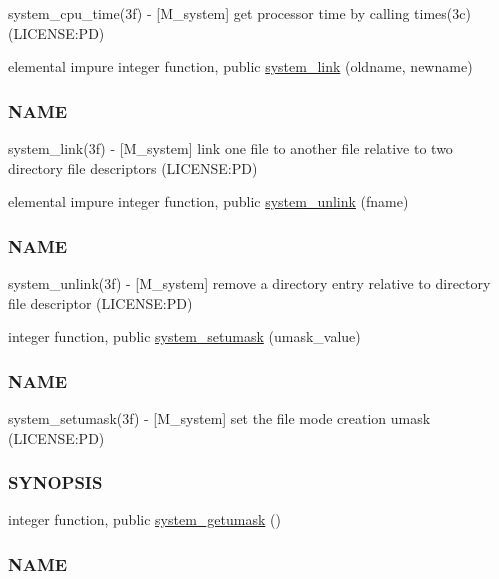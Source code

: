 \begin{DoxyCompactItemize}
\begin{DoxyCompactList}
system\+\_\+cpu\+\_\+time(3f) -\/ \mbox{[}M\+\_\+system\mbox{]} get processor time by calling times(3c) (L\+I\+C\+E\+N\+SE\+:PD) \end{DoxyCompactList}\item 
elemental impure integer function, public \mbox{\hyperlink{namespacem__system_a0e04b5499fc3367eda9758b6e396a103}{system\+\_\+link}} (oldname, newname)
\begin{DoxyCompactList}\small\item\em \subsubsection*{N\+A\+ME}

system\+\_\+link(3f) -\/ \mbox{[}M\+\_\+system\mbox{]} link one file to another file relative to two directory file descriptors (L\+I\+C\+E\+N\+SE\+:PD) \end{DoxyCompactList}\item 
elemental impure integer function, public \mbox{\hyperlink{namespacem__system_a3561c9beafec28439f760d701d55a6b8}{system\+\_\+unlink}} (fname)
\begin{DoxyCompactList}\small\item\em \subsubsection*{N\+A\+ME}

system\+\_\+unlink(3f) -\/ \mbox{[}M\+\_\+system\mbox{]} remove a directory entry relative to directory file descriptor (L\+I\+C\+E\+N\+SE\+:PD) \end{DoxyCompactList}\item 
integer function, public \mbox{\hyperlink{namespacem__system_a04fd02e6f5ce2f8ecdfb577e1490feba}{system\+\_\+setumask}} (umask\+\_\+value)
\begin{DoxyCompactList}\small\item\em \subsubsection*{N\+A\+ME}

system\+\_\+setumask(3f) -\/ \mbox{[}M\+\_\+system\mbox{]} set the file mode creation umask (L\+I\+C\+E\+N\+SE\+:PD) \subsubsection*{S\+Y\+N\+O\+P\+S\+IS}\end{DoxyCompactList}\item 
integer function, public \mbox{\hyperlink{namespacem__system_aa9ca951be39d2ea738d627cf42c00ddd}{system\+\_\+getumask}} ()
\begin{DoxyCompactList}\small\item\em \subsubsection*{N\+A\+ME}


\end{DoxyCompactList}
\end{DoxyCompactItemize}
